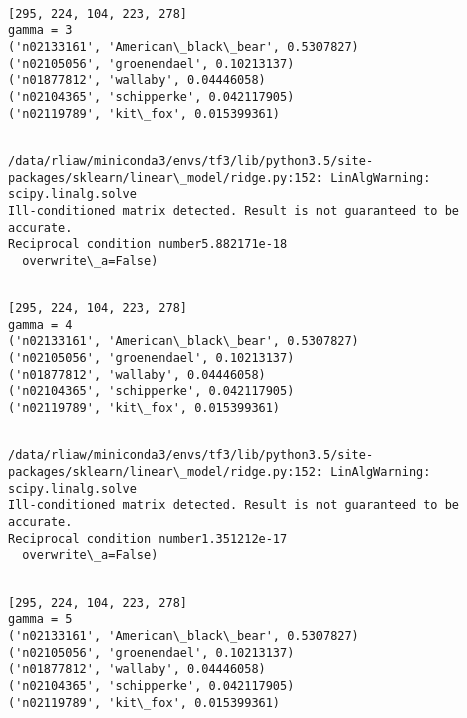 \documentclass[11pt]{article}
\begin{document}
    \begin{Verbatim}[commandchars=\\\{\}]

[295, 224, 104, 223, 278]
gamma = 3
('n02133161', 'American\_black\_bear', 0.5307827)
('n02105056', 'groenendael', 0.10213137)
('n01877812', 'wallaby', 0.04446058)
('n02104365', 'schipperke', 0.042117905)
('n02119789', 'kit\_fox', 0.015399361)


    \end{Verbatim}

    \begin{Verbatim}[commandchars=\\\{\}]
/data/rliaw/miniconda3/envs/tf3/lib/python3.5/site-packages/sklearn/linear\_model/ridge.py:152: LinAlgWarning: scipy.linalg.solve
Ill-conditioned matrix detected. Result is not guaranteed to be accurate.
Reciprocal condition number5.882171e-18
  overwrite\_a=False)

    \end{Verbatim}

    \begin{Verbatim}[commandchars=\\\{\}]

[295, 224, 104, 223, 278]
gamma = 4
('n02133161', 'American\_black\_bear', 0.5307827)
('n02105056', 'groenendael', 0.10213137)
('n01877812', 'wallaby', 0.04446058)
('n02104365', 'schipperke', 0.042117905)
('n02119789', 'kit\_fox', 0.015399361)


    \end{Verbatim}

    \begin{Verbatim}[commandchars=\\\{\}]
/data/rliaw/miniconda3/envs/tf3/lib/python3.5/site-packages/sklearn/linear\_model/ridge.py:152: LinAlgWarning: scipy.linalg.solve
Ill-conditioned matrix detected. Result is not guaranteed to be accurate.
Reciprocal condition number1.351212e-17
  overwrite\_a=False)

    \end{Verbatim}

    \begin{Verbatim}[commandchars=\\\{\}]

[295, 224, 104, 223, 278]
gamma = 5
('n02133161', 'American\_black\_bear', 0.5307827)
('n02105056', 'groenendael', 0.10213137)
('n01877812', 'wallaby', 0.04446058)
('n02104365', 'schipperke', 0.042117905)
('n02119789', 'kit\_fox', 0.015399361)


    \end{Verbatim}
\end{document}

